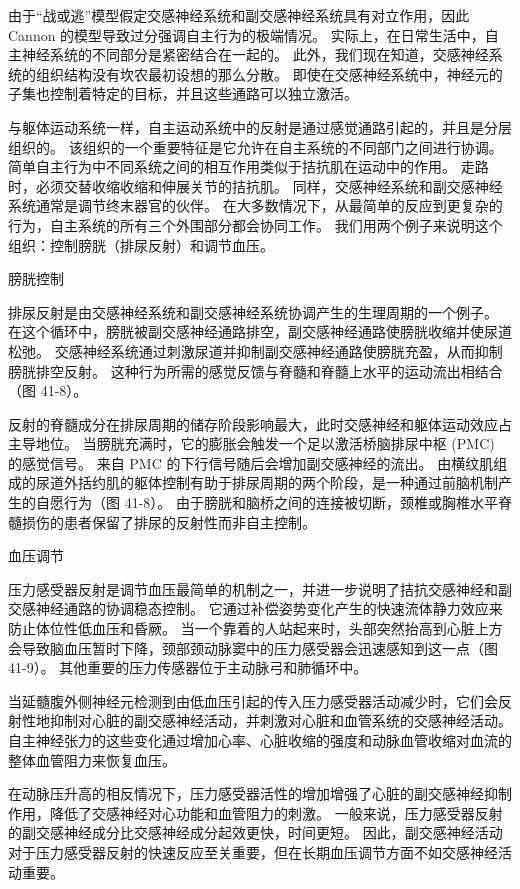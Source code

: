 由于“战或逃”模型假定交感神经系统和副交感神经系统具有对立作用，因此 Cannon 的模型导致过分强调自主行为的极端情况。 实际上，在日常生活中，自主神经系统的不同部分是紧密结合在一起的。 此外，我们现在知道，交感神经系统的组织结构没有坎农最初设想的那么分散。 即使在交感神经系统中，神经元的子集也控制着特定的目标，并且这些通路可以独立激活。

与躯体运动系统一样，自主运动系统中的反射是通过感觉通路引起的，并且是分层组织的。 该组织的一个重要特征是它允许在自主系统的不同部门之间进行协调。 简单自主行为中不同系统之间的相互作用类似于拮抗肌在运动中的作用。 走路时，必须交替收缩收缩和伸展关节的拮抗肌。 同样，交感神经系统和副交感神经系统通常是调节终末器官的伙伴。 在大多数情况下，从最简单的反应到更复杂的行为，自主系统的所有三个外围部分都会协同工作。 我们用两个例子来说明这个组织：控制膀胱（排尿反射）和调节血压。

膀胱控制

排尿反射是由交感神经系统和副交感神经系统协调产生的生理周期的一个例子。 在这个循环中，膀胱被副交感神经通路排空，副交感神经通路使膀胱收缩并使尿道松弛。 交感神经系统通过刺激尿道并抑制副交感神经通路使膀胱充盈，从而抑制膀胱排空反射。 这种行为所需的感觉反馈与脊髓和脊髓上水平的运动流出相结合（图 41-8）。

反射的脊髓成分在排尿周期的储存阶段影响最大，此时交感神经和躯体运动效应占主导地位。 当膀胱充满时，它的膨胀会触发一个足以激活桥脑排尿中枢 (PMC) 的感觉信号。 来自 PMC 的下行信号随后会增加副交感神经的流出。 由横纹肌组成的尿道外括约肌的躯体控制有助于排尿周期的两个阶段，是一种通过前脑机制产生的自愿行为（图 41-8）。 由于膀胱和脑桥之间的连接被切断，颈椎或胸椎水平脊髓损伤的患者保留了排尿的反射性而非自主控制。

血压调节

压力感受器反射是调节血压最简单的机制之一，并进一步说明了拮抗交感神经和副交感神经通路的协调稳态控制。 它通过补偿姿势变化产生的快速流体静力效应来防止体位性低血压和昏厥。 当一个靠着的人站起来时，头部突然抬高到心脏上方会导致脑血压暂时下降，颈部颈动脉窦中的压力感受器会迅速感知到这一点（图 41-9）。 其他重要的压力传感器位于主动脉弓和肺循环中。

当延髓腹外侧神经元检测到由低血压引起的传入压力感受器活动减少时，它们会反射性地抑制对心脏的副交感神经活动，并刺激对心脏和血管系统的交感神经活动。 自主神经张力的这些变化通过增加心率、心脏收缩的强度和动脉血管收缩对血流的整体血管阻力来恢复血压。

在动脉压升高的相反情况下，压力感受器活性的增加增强了心脏的副交感神经抑制作用，降低了交感神经对心功能和血管阻力的刺激。 一般来说，压力感受器反射的副交感神经成分比交感神经成分起效更快，时间更短。 因此，副交感神经活动对于压力感受器反射的快速反应至关重要，但在长期血压调节方面不如交感神经活动重要。

